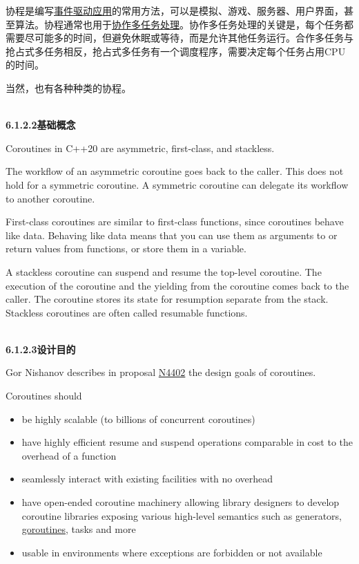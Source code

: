 协程是编写\href{https://en.wikipedia.org/wiki/Event-driven_programming}{事件驱动应用}的常用方法，可以是模拟、游戏、服务器、用户界面，甚至算法。协程通常也用于\href{https://en.wikipedia.org/wiki/Computer_multitasking}{协作多任务处理}。协作多任务处理的关键是，每个任务都需要尽可能多的时间，但避免休眠或等待，而是允许其他任务运行。合作多任务与抢占式多任务相反，抢占式多任务有一个调度程序，需要决定每个任务占用CPU的时间。

当然，也有各种种类的协程。

\hspace*{\fill} \\ %
\noindent
\textbf{6.1.2.2\hspace{0.2cm}基础概念}

Coroutines in C++20 are asymmetric, first-class, and stackless.

The workflow of an asymmetric coroutine goes back to the caller. This does not hold for a symmetric coroutine. A symmetric coroutine can delegate its workflow to another coroutine.

First-class coroutines are similar to first-class functions, since coroutines behave like data. Behaving like data means that you can use them as arguments to or return values from functions, or store them in a variable.

A stackless coroutine can suspend and resume the top-level coroutine. The execution of the coroutine and the yielding from the coroutine comes back to the caller. The coroutine stores its state for resumption separate from the stack. Stackless coroutines are often called resumable functions.

\hspace*{\fill} \\ %
\noindent
\textbf{6.1.2.3\hspace{0.2cm}设计目的}

Gor Nishanov describes in proposal \href{https://isocpp.org/files/papers/N4402.pdf}{N4402} the design goals of coroutines.

Coroutines should

\begin{itemize}
\item 
be highly scalable (to billions of concurrent coroutines)

\item 
have highly efficient resume and suspend operations comparable in cost to the overhead of a function

\item 
seamlessly interact with existing facilities with no overhead

\item 
have open-ended coroutine machinery allowing library designers to develop coroutine libraries exposing various high-level semantics such as generators, \href{https://tour.golang.org/concurrency/1}{goroutines}, tasks and more

\item 
usable in environments where exceptions are forbidden or not available
\end{itemize}

